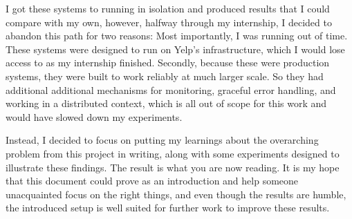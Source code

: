 \documentclass[a4paper,11pt]{kth-mag}
\begin{document}
I got these systems to running in isolation and produced results that I could compare with my own, however, halfway through my internship, I decided to abandon this path for two reasons: Most importantly, I was running out of time. These systems were designed to run on Yelp's infrastructure, which I would lose access to as my internship finished. Secondly, because these were production systems, they were built to work reliably at much larger scale. So they had additional additional mechanisms for monitoring, graceful error handling, and working in a distributed context, which is all out of scope for this work and would have slowed down my experiments.

Instead, I decided to focus on putting my learnings about the overarching problem from this project in writing, along with some experiments designed to illustrate these findings. The result is what you are now reading. It is my hope that this document could prove as an introduction and help someone unacquainted focus on the right things, and even though the results are humble,
the introduced setup is well suited for further work to improve these results.





\end{document}
